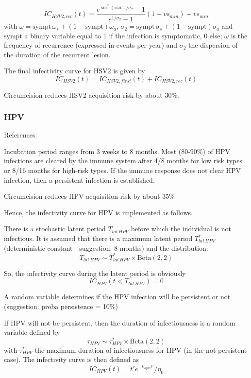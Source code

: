 \documentclass[11pt, onecolumn]{article}
\begin{document}
$$ IC_{HSV2,rec}(t) =  \frac{e^{\sin^2(\pi\omega t)/\sigma_2}-1}{e^{1/\sigma_2}-1}  (1-vs_{min})+ vs_{min}$$
with $\omega = \mathrm{sympt}\,\omega_s + (1- \mathrm{sympt})\omega_a$, $\sigma_2 = \mathrm{sympt}\,\sigma_s + (1- \mathrm{sympt})\sigma_a$ and  $ \mathrm{sympt}$ a binary variable equal to 1 if the infection is symptomatic, 0 else; $\omega$ is the frequency of recurrence (expressed in events per year) and $\sigma_2$ the dispersion of the duration of the recurrent lesion.

The final infectivity curve for HSV2 is given by
$$IC_{HSV2}(t) = IC_{HSV2,first}(t) + IC_{HSV2,rec}(t)   $$

Circumcision reduces HSV2 acquisition risk by about 30\%\cite{Tobian:2009kp}.


\subsubsection{HPV}

References: \cite{Stanley:2011dd} \cite{Baussano:2013dh}


Incubation period ranges from 3 weeks to 8 months. Most (80-90\%) of HPV infections are cleared by the immune system after 4/8 months for low risk types or 8/16 months for high-risk types. If the immune response does not clear HPV infection, then a persistent infection is established.

Circumcision reduces HPV acquisition risk by about 35\% \cite{Tobian:2009kp}

Hence, the infectivity curve for HPV is implemented as follows. 

There is a stochastic latent period $T_{lat\,HPV}$ before which the individual is not infectious. It is assumed that there is a maximum latent period $T_{lat\,HPV}^*$ (deterministic constant - suggestion: 8 months) and the distribution:
$$T_{lat\,HPV} \sim T_{lat\,HPV}^* \times \mathrm{Beta}(2,2) $$

So, the infectivity curve during the latent period is obviously
$$IC_{HPV}(t< T_{lat\,HPV}) = 0$$

A random variable determines if the HPV infection will be persistent or not (suggestion: proba persistence = 10\%)

If HPV will not be persistent, then the duration of infectiousness is a random variable defined by
$$\tau_{HPV} \sim \tau_{HPV}^*  \times   \mathrm{Beta}(2,2)$$
with $\tau_{HPV}^* $ the maximum duration of infectiousness for HPV (in the not persistent case). The infectivity curve is then defined as
$$IC_{HPV}(t) = t' e^{-k_{hpv}\, t' }/ \eta_0$$
\end{document}
